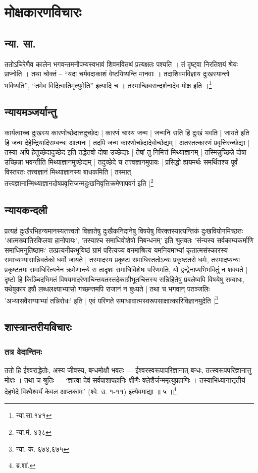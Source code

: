\chapter{मोक्षकारणविचारः}

\section{न्या. सा.} ततोऽचिरेणैव कालेन भगवन्तमनौपम्यस्वभावं शिवमवितथं प्रत्यक्षतः पश्यति । तं दृष्ट्वा निरतिशयं श्रेयः प्राप्नोति । तथा चोक्तं – “यदा चर्मवदाकाशं वेष्टयिष्यन्ति मानवाः । तदाशिवमविज्ञाय दुःखस्यान्तो भविष्यति”, “तमेव विदित्वातिमृत्युमेति” इत्यादि च । तस्माच्छिवसन्दर्शनादेव मोक्ष इति ।\footnote{न्या.सा.१४१}


\section{न्यायमञ्जर्यान्तु} कार्यत्वाच्च दुःखस्य कारणोच्छेदात्तदुच्छेदः | कारणं चास्य जन्म | जन्मनि सति हि दुःखं भवति | जायते इति हि जन्म देहेन्द्रियादिसम्बन्धः आत्मनः | तदपि जन्म कारणोच्छेदादेवोच्छेद्यम् | अतस्तत्कारणं प्रवृत्तिरुच्छेद्या | तस्या अपि हेतूच्छेदादुच्छेद इति तद्धेतवो दोषा उच्छेद्याः | तेषां तु निमित्तं मिथ्याज्ञानम् | तस्मिन्नुच्छिन्ने दोषा उच्छिन्ना भवन्तीति मिथ्याज्ञानमुच्छेद्यम् | तदुच्छेदे च तत्त्वज्ञानमुपायः | प्रसिद्धो ह्ययमर्थः समर्थितश्च पूर्वं विस्तरतः तत्त्वज्ञानं मिथ्याज्ञानस्य बाधकमिति | तस्मात् तत्त्वज्ञानान्मिथ्याज्ञानदोषप्रवृत्तिजन्मदुःखनिवृत्तिक्रमेणापवर्ग इति |\footnote{न्या.मं. ४३८}
 
\section{न्यायकन्दली} प्रत्यहं दुःखैरभिहन्यमानस्यतत्त्वतो विज्ञातेषु दुःखैकनिदानेषु विषयेषु विरक्तस्यात्यन्तिकं दुःखवियोगमिच्छतः 'आत्मख्यातिरविप्लवा हानोपायः', 'तस्याश्च समाधिवोशेषो निबन्धनम्' इति श्रुतवतः 'संन्यस्य सर्वकाम्यकर्माणि समाधिमनुतिष्ठामः' तत्प्रत्यनीकभूयिष्ठं ग्रामं परित्यज्य वनमाश्रित्य यमनियमाभ्यां कृतात्मसंस्कारस्य समाध्यभ्यासान्निवर्तको धर्मो जायते | तस्मादस्य प्रकृष्टः समाधिस्ततोऽन्यः प्रकृष्टतरो धर्मः, तस्मादप्यन्यः‌ प्रकृष्टतमः समाधिरित्यनेन क्रमेणान्त्ये स तादृशः समाधिविशेषः परिणमति, यो द्वन्द्वेनाप्यभिभवितुं न शक्यते | दृष्टो हि किञ्चिदभिमतं विषयमादरेणाचिन्तयतस्तदेकाग्रीभूतचित्तस्य सन्निहितेषु प्रबलेष्वपि विषयेषु सम्बाधः, यथेषुकार इषौ लब्धलक्ष्याभ्यासो गच्छन्तमपि राजानं न बुध्यते | तथा च भगवान् पतञ्जलिः 'अभ्यासवैराग्याभ्यां तन्निरोधः' इति | एवं परिणते समाधावात्मस्वरूपसाक्षात्कारिविज्ञानमुदेति |\footnote{न्या. कं. ६७४,६७५}

\section{शास्त्रान्तरीयविचारः}

\subsection{तत्र वेदान्तिनः} ततो हि ईश्वराद्धेतोः, अस्य जीवस्य, बन्धमोक्षौ भवतः — ईश्वरस्वरूपापरिज्ञानात् बन्धः, तत्स्वरूपपरिज्ञानात्तु मोक्षः । तथा च श्रुतिः — ‘ज्ञात्वा देवं सर्वपाशापहानिः क्षीणैः क्लेशैर्जन्ममृत्युप्रहाणिः । तस्याभिध्यानात्तृतीयं देहभेदे विश्वैश्वर्यं केवल आप्तकामः’ (श्वे. उ. १-११) इत्येवमाद्या ॥ ५ ॥\footnote{ब्र.शां.}
